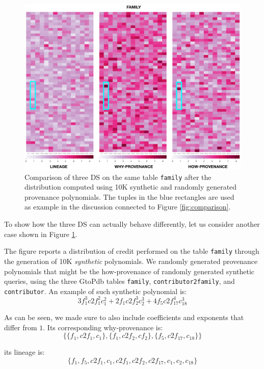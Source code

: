 \begin{figure}[tb]
  \includegraphics[width=1\textwidth]{figures/synthetic_polynomials}
  \caption{Comparison of three DS on the same table \texttt{family} after the distribution computed using 10K synthetic and randomly generated provenance polynomials. The tuples in the blue rectangles are used as example in the discussion connected to Figure \ref{fig:comparison}.}
  \label{figure:comparison_on_synthetic_polynomials_2}
\end{figure}

To show how the three DS can actually behave differently, let us consider another case shown in Figure \ref{figure:comparison_on_synthetic_polynomials_2}. 


The figure reports a distribution of credit performed on the table \texttt{family} through the generation of 10K \emph{synthetic} polynomials. 
We randomly generated provenance polynomials that might be the how-provenance of randomly generated synthetic queries, using the three GtoPdb tables \texttt{family}, \texttt{contributor2family}, and \texttt{contributor}. 
An example of such synthetic polynomial is:
{\footnotesize
\[
3 f_1^3 c2f_1^2 c_1^2 + 2 f_1 c2f_2^3 c_2^3 + 4 f_5 c2f_{17}^4 c_{18}^3
\] }

As can be seen, we made sure to also include coefficients and exponents that differ from $1$.
Its corresponding why-provenance is: 
{\footnotesize
\[
\{ \{f_1, c2f_1, c_1\}, \{f_1, c2f_2, cf_2\}, \{ f_5, c2f_{17}, c_{18}\} \}
\] 
}

its lineage is: 
{\footnotesize
\[
\{f_1, f_5, c2f_1, c_1, c2f_1, c2f_2, c2f_{17}, c_1, c_2, c_{18} \}
\]
 }
 

